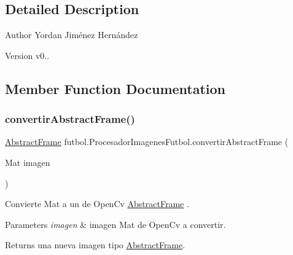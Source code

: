 \subsection{Detailed Description}
\begin{DoxyAuthor}{Author}
Yordan Jiménez Hernández 
\end{DoxyAuthor}
\begin{DoxyVersion}{Version}
v0.. 
\end{DoxyVersion}


\subsection{Member Function Documentation}
\hypertarget{classfutbol_1_1_procesador_imagenes_futbol_af8c46491f6af9db1919244988e94bf16}{}\label{classfutbol_1_1_procesador_imagenes_futbol_af8c46491f6af9db1919244988e94bf16} 
\subsubsection{\texorpdfstring{convertir\+Abstract\+Frame()}{convertirAbstractFrame()}}
{\footnotesize\ttfamily \hyperlink{classfutbol_1_1_abstract_frame}{Abstract\+Frame} futbol.\+Procesador\+Imagenes\+Futbol.\+convertir\+Abstract\+Frame (\begin{DoxyParamCaption}\item[{Mat}]{imagen }\end{DoxyParamCaption})\hspace{0.3cm}{\ttfamily [private]}}

Convierte Mat a un de Open\+Cv \hyperlink{classfutbol_1_1_abstract_frame}{Abstract\+Frame} . 
\begin{DoxyParams}{Parameters}
{\em imagen} & imagen Mat de Open\+Cv a convertir. \\
\hline
\end{DoxyParams}
\begin{DoxyReturn}{Returns}
una nueva imagen tipo \hyperlink{classfutbol_1_1_abstract_frame}{Abstract\+Frame}. 
\end{DoxyReturn}
\hypertarget{classfutbol_1_1_procesador_imagenes_futbol_a1d5adc24497f2131df236b921457f1d2}{}\label{classfutbol_1_1_procesador_imagenes_futbol_a1d5adc24497f2131df236b921457f1d2} 

